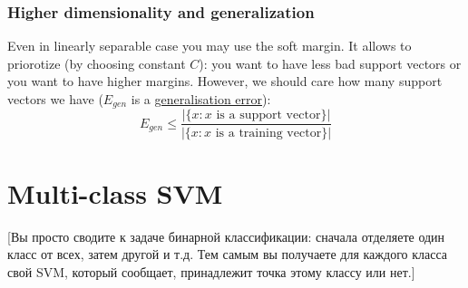 \subsubsection*{Higher dimensionality and generalization}

Even in linearly separable case you may use the soft margin. It allows to priorotize (by choosing constant $C$): you want to have less bad support vectors or you want to have higher margins. However, we should care how many support vectors we have ($E_{gen}$ is a \hyperlink{gen_error}{generalisation error}):
$$E_{gen}\le\frac{|\{x\colon x \text{ is a support vector}\}|}{|\{x\colon x \text{ is a training vector}\}|}$$

\section{Multi-class SVM}

[Вы просто сводите к задаче бинарной классификации: сначала отделяете один класс от всех, затем другой и т.д. Тем самым вы получаете для каждого класса свой SVM, который сообщает, принадлежит точка этому классу или нет.]
